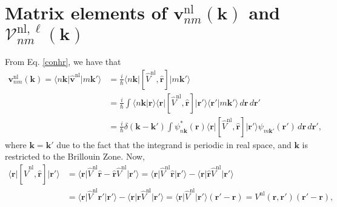 
\section[Matrix elements of the nonlocal potentials.]
{Matrix elements of
\texorpdfstring{$\mathbf{v}^\mathrm{nl}_{nm}(\mathbf{k})$}{vnl} and 
\texorpdfstring{$\boldsymbol{\mathcal{V}}^{\mathrm{nl},\ell}_{nm}(\mathbf{k})$}
{calVnl}}
\label{app:vnlme}

From Eq. \eqref{conhr}, we have that
\begin{align}\label{vnln.0}
\mathbf{v}^\mathrm{nl}_{nm}(\mathbf{k})
 = \langle n\mathbf{k}\vert\hat{\mathbf{v}}^\mathrm{nl}\vert m\mathbf{k}'\rangle
&= \frac{i}{\hbar}\langle n\mathbf{k}\vert
   \left[\hat{V}^\mathrm{nl},\hat{\mathbf{r}}\right]
   \vert m\mathbf{k}'\rangle\nonumber\\
&= \frac{i}{\hbar}\int
   \langle n\mathbf{k}\vert\mathbf{r}\rangle
   \langle\mathbf{r}\vert
   \left[\hat{V}^\mathrm{nl},\hat{\mathbf{r}}\right]
   \vert\mathbf{r}'\rangle
   \langle\mathbf{r}'\vert m\mathbf{k}'\rangle
   \,d\mathbf{r}\,d\mathbf{r}'\nonumber\\
&= \frac{i}{\hbar}\delta(\mathbf{k}-\mathbf{k}')\int 
   \psi^{*}_{n\mathbf{k}}(\mathbf{r})
   \langle\mathbf{r}\vert
   \left[\hat{V}^\mathrm{nl},\hat{\mathbf{r}}\right]
   \vert\mathbf{r}'\rangle
   \psi_{m\mathbf{k}'}(\mathbf{r}')
   \,d\mathbf{r}\,d\mathbf{r}',
\end{align}   
where $\mathbf{k}=\mathbf{k}'$ due to the fact that the integrand is periodic in
real space, and $\mathbf{k}$ is restricted to the Brillouin Zone. Now,
\begin{align}\label{vnln.1}
\langle\mathbf{r}\vert
\left[\hat{V}^\mathrm{nl},\hat{\mathbf{r}}\right]
\vert\mathbf{r}'\rangle
&= \langle\mathbf{r}\vert\hat{V}^\mathrm{nl}\hat{\mathbf{r}}
   - \hat{\mathbf{r}}\hat{V}^\mathrm{nl}\vert\mathbf{r}'\rangle
 = \langle\mathbf{r}\vert
   \hat{V}^\mathrm{nl}\hat{\mathbf{r}}
   \vert\mathbf{r}'\rangle
   - \langle\mathbf{r}\vert
     \hat{\mathbf{r}}\hat{V}^\mathrm{nl}
     \vert\mathbf{r}'\rangle\nonumber\\
&= \langle\mathbf{r}\vert\hat{V}^\mathrm{nl} \mathbf{r}'\vert\mathbf{r}'\rangle
   - \langle\mathbf{r}\vert\mathbf{r}\hat{V}^\mathrm{nl}\vert\mathbf{r}'\rangle
 = \langle\mathbf{r}\vert\hat{V}^\mathrm{nl}\vert\mathbf{r}'\rangle
   (\mathbf{r}'-\mathbf{r})
 = V^\mathrm{nl}(\mathbf{r},\mathbf{r}')(\mathbf{r}'-\mathbf{r}),
\end{align}
